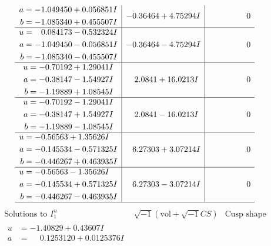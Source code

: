 \documentclass[1p]{elsarticle_modified}
\theoremstyle{definition}
\newcommand{\I}{\sqrt{-1}}
\begin{document}
$$\begin{array}{c|c|c}
\begin{aligned}
a &= -1.049450 + 0.056851 I \\
b &= -1.085340 + 0.455507 I\end{aligned}
 & -0.36464 + 4.75294 I & \phantom{-0.000000 } 0 \\ \hline\begin{aligned}
u &= \phantom{-}0.084173 - 0.532324 I \\
a &= -1.049450 - 0.056851 I \\
b &= -1.085340 - 0.455507 I\end{aligned}
 & -0.36464 - 4.75294 I & \phantom{-0.000000 } 0 \\ \hline\begin{aligned}
u &= -0.70192 + 1.29041 I \\
a &= -0.38147 - 1.54927 I \\
b &= -1.19889 + 1.08545 I\end{aligned}
 & \phantom{-}2.0841 + 16.0213 I & \phantom{-0.000000 } 0 \\ \hline\begin{aligned}
u &= -0.70192 - 1.29041 I \\
a &= -0.38147 + 1.54927 I \\
b &= -1.19889 - 1.08545 I\end{aligned}
 & \phantom{-}2.0841 - 16.0213 I & \phantom{-0.000000 } 0 \\ \hline\begin{aligned}
u &= -0.56563 + 1.35626 I \\
a &= -0.145534 - 0.571325 I \\
b &= -0.446267 + 0.463935 I\end{aligned}
 & \phantom{-}6.27303 + 3.07214 I & \phantom{-0.000000 } 0 \\ \hline\begin{aligned}
u &= -0.56563 - 1.35626 I \\
a &= -0.145534 + 0.571325 I \\
b &= -0.446267 - 0.463935 I\end{aligned}
 & \phantom{-}6.27303 - 3.07214 I & \phantom{-0.000000 } 0\\
 \hline 
 \end{array}$$\newpage$$\begin{array}{c|c|c}  
\text{Solutions to }I^u_{1}& \I (\text{vol} + \sqrt{-1}CS) & \text{Cusp shape}\\
 \hline 
\begin{aligned}
u &= -1.40829 + 0.43607 I \\
a &= \phantom{-}0.1253120 + 0.0125376 I \\

\end{aligned}
\end{array}$$
\end{document}
